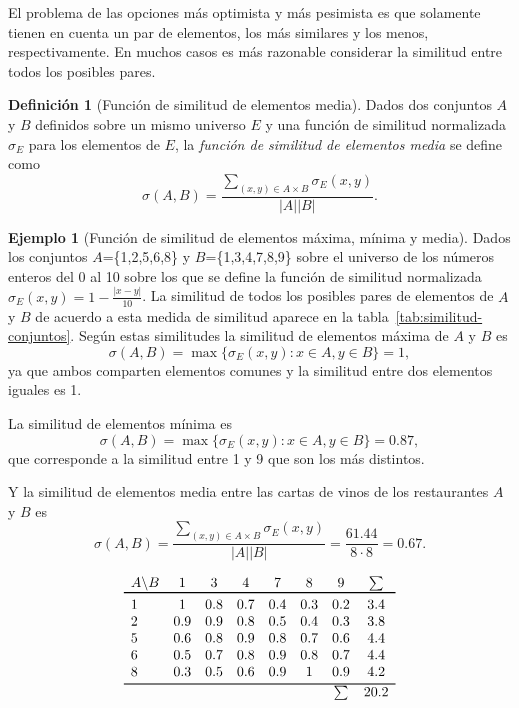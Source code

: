 \documentclass[a4paper,10pt,twoside]{article}
\theoremstyle{definition}
\newtheorem{definition}{Definición}
\newtheorem{example}{Ejemplo}
\begin{document}
El problema de las opciones más optimista y más pesimista es que solamente tienen en cuenta un par de elementos, los más similares y los menos, respectivamente.
En muchos casos es más razonable considerar la similitud entre todos los posibles pares.

\begin{definition}[Función de similitud de elementos media]
Dados dos conjuntos $A$ y $B$ definidos sobre un mismo universo $E$ y una función de similitud normalizada $\sigma_E$ para los elementos de $E$, la \emph{función de similitud de elementos media} se define como
\[
\sigma(A,B)=\frac{\sum_{(x,y)\in A\times B} \sigma_E(x,y)}{|A||B|}.
\]
\end{definition}

\begin{example}[Función de similitud de elementos máxima, mínima y media]
Dados los conjuntos $A$=\{1,2,5,6,8\} y $B$=\{1,3,4,7,8,9\} sobre el universo de los números enteros del 0 al 10 sobre los que se define la función de similitud normalizada $\sigma_E(x,y)=1-\frac{|x-y|}{10}$.
La similitud de todos los posibles pares de elementos de $A$ y $B$ de acuerdo a esta medida de similitud aparece en la tabla~\ref{tab:similitud-conjuntos}.
Según estas similitudes la similitud de elementos máxima de $A$ y $B$ es
\[
\sigma(A,B)=\max\{\sigma_E(x,y): x\in A, y\in B\}= 1,
\]
ya que ambos comparten elementos comunes y la similitud entre dos elementos iguales es 1. 

La similitud de elementos mínima es 
\[
\sigma(A,B)=\max\{\sigma_E(x,y): x\in A, y\in B\}= 0.87,
\]
que corresponde a la similitud entre 1 y 9 que son los más distintos.

Y la similitud de elementos media entre las cartas de vinos de los restaurantes $A$ y $B$ es 
\[
\sigma(A,B)=\frac{\sum_{(x,y)\in A\times B} \sigma_E(x,y)}{|A||B|}= \frac{61.44}{8\cdot 8}=0.67.
\]
\end{example}

\begin{table}[htbp!]
\caption{Medidas de similitud entre los elementos de los conjuntos $A$=\{1,2,5,6,8\} y $B$=\{1,3,4,7,8,9\} mediante la función de similitud $\sigma_E(x,y)=1-\frac{|x-y|}{10}$.}
\label{tab:puntuacion-cata-vinos}
\[
\begin{array}{lccccccc}
A\backslash B & 1 & 3 & 4 & 7 & 8 & 9 & \sum \\
\toprule
1 & 1 & 0.8 & 0.7 & 0.4 & 0.3 & 0.2 & 3.4\\
2 & 0.9 & 0.9 & 0.8 & 0.5 & 0.4 & 0.3 & 3.8\\
5 & 0.6 & 0.8 & 0.9 & 0.8 & 0.7 & 0.6 & 4.4\\
6 & 0.5 & 0.7 & 0.8 & 0.9 & 0.8 & 0.7 & 4.4\\
8 & 0.3 & 0.5 & 0.6 & 0.9 & 1 & 0.9 & 4.2\\
\bottomrule
  &  &  &  &  &  & \sum & 20.2\\
\end{array}
\]
\end{table}
\end{document}

